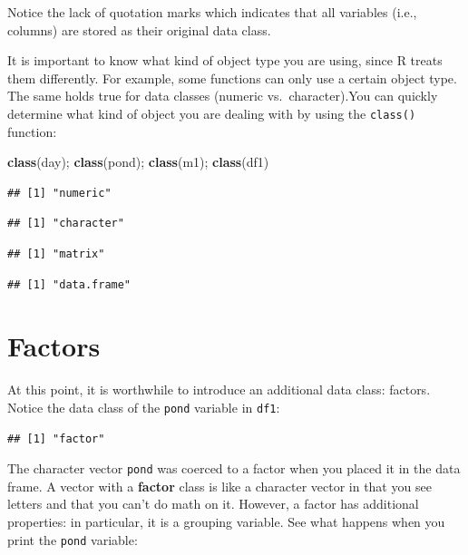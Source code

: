\documentclass[]{book}
\newenvironment{Shaded}{\begin{snugshade}}{\end{snugshade}}
\newcommand{\KeywordTok}[1]{\textcolor[rgb]{0.13,0.29,0.53}{\textbf{#1}}}
\newcommand{\OperatorTok}[1]{\textcolor[rgb]{0.81,0.36,0.00}{\textbf{#1}}}
\newcommand{\NormalTok}[1]{#1}
\theoremstyle{definition}
\theoremstyle{definition}
\theoremstyle{definition}
\theoremstyle{remark}
\begin{document}
Notice the lack of quotation marks which indicates that all variables
(i.e., columns) are stored as their original data class.

It is important to know what kind of object type you are using, since R
treats them differently. For example, some functions can only use a
certain object type. The same holds true for data classes (numeric
vs.~character).You can quickly determine what kind of object you are
dealing with by using the \texttt{class()} function:

\begin{Shaded}
\begin{Highlighting}[]
\KeywordTok{class}\NormalTok{(day); }\KeywordTok{class}\NormalTok{(pond); }\KeywordTok{class}\NormalTok{(m1); }\KeywordTok{class}\NormalTok{(df1)}
\end{Highlighting}
\end{Shaded}

\begin{verbatim}
## [1] "numeric"
\end{verbatim}

\begin{verbatim}
## [1] "character"
\end{verbatim}

\begin{verbatim}
## [1] "matrix"
\end{verbatim}

\begin{verbatim}
## [1] "data.frame"
\end{verbatim}

\section{Factors}\label{factors}

At this point, it is worthwhile to introduce an additional data class:
factors. Notice the data class of the \texttt{pond} variable in
\texttt{df1}:

\begin{Shaded}
\end{Shaded}

\begin{verbatim}
## [1] "factor"
\end{verbatim}

The character vector \texttt{pond} was coerced to a factor when you
placed it in the data frame. A vector with a \textbf{factor} class is
like a character vector in that you see letters and that you can't do
math on it. However, a factor has additional properties: in particular,
it is a grouping variable. See what happens when you print the
\texttt{pond} variable:
\end{document}
